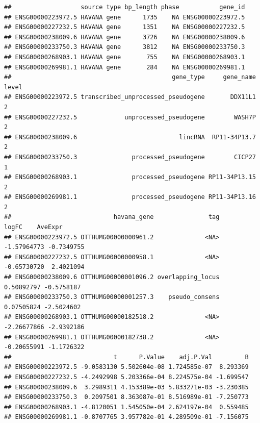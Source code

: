 \documentclass[
]{article}
\newenvironment{Shaded}{\begin{snugshade}}{\end{snugshade}}
\newcommand{\CommentTok}[1]{\textcolor[rgb]{0.56,0.35,0.01}{\textit{#1}}}
\newcommand{\FloatTok}[1]{\textcolor[rgb]{0.00,0.00,0.81}{#1}}
\newcommand{\FunctionTok}[1]{\textcolor[rgb]{0.13,0.29,0.53}{\textbf{#1}}}
\newcommand{\NormalTok}[1]{#1}
\newcommand{\SpecialCharTok}[1]{\textcolor[rgb]{0.81,0.36,0.00}{\textbf{#1}}}
\begin{document}
\begin{verbatim}
##                   source type bp_length phase           gene_id
## ENSG00000223972.5 HAVANA gene      1735    NA ENSG00000223972.5
## ENSG00000227232.5 HAVANA gene      1351    NA ENSG00000227232.5
## ENSG00000238009.6 HAVANA gene      3726    NA ENSG00000238009.6
## ENSG00000233750.3 HAVANA gene      3812    NA ENSG00000233750.3
## ENSG00000268903.1 HAVANA gene       755    NA ENSG00000268903.1
## ENSG00000269981.1 HAVANA gene       284    NA ENSG00000269981.1
##                                            gene_type     gene_name level
## ENSG00000223972.5 transcribed_unprocessed_pseudogene       DDX11L1     2
## ENSG00000227232.5             unprocessed_pseudogene        WASH7P     2
## ENSG00000238009.6                            lincRNA  RP11-34P13.7     2
## ENSG00000233750.3               processed_pseudogene        CICP27     1
## ENSG00000268903.1               processed_pseudogene RP11-34P13.15     2
## ENSG00000269981.1               processed_pseudogene RP11-34P13.16     2
##                            havana_gene               tag       logFC    AveExpr
## ENSG00000223972.5 OTTHUMG00000000961.2              <NA> -1.57964773 -0.7349755
## ENSG00000227232.5 OTTHUMG00000000958.1              <NA> -0.65730720  2.4021094
## ENSG00000238009.6 OTTHUMG00000001096.2 overlapping_locus  0.50892797 -0.5758187
## ENSG00000233750.3 OTTHUMG00000001257.3    pseudo_consens  0.07505824 -2.5024602
## ENSG00000268903.1 OTTHUMG00000182518.2              <NA> -2.26677866 -2.9392186
## ENSG00000269981.1 OTTHUMG00000182738.2              <NA> -0.20655991 -1.1726322
##                            t      P.Value    adj.P.Val         B
## ENSG00000223972.5 -9.0583130 5.502604e-08 1.724585e-07  8.293369
## ENSG00000227232.5 -4.2492998 5.203366e-04 8.224575e-04 -1.699547
## ENSG00000238009.6  3.2989311 4.153389e-03 5.833271e-03 -3.230385
## ENSG00000233750.3  0.2097501 8.363087e-01 8.516989e-01 -7.250773
## ENSG00000268903.1 -4.8120051 1.545050e-04 2.624197e-04  0.559485
## ENSG00000269981.1 -0.8707765 3.957782e-01 4.289509e-01 -7.156075
\end{verbatim}

\begin{Shaded}
\end{Shaded}
\end{document}
